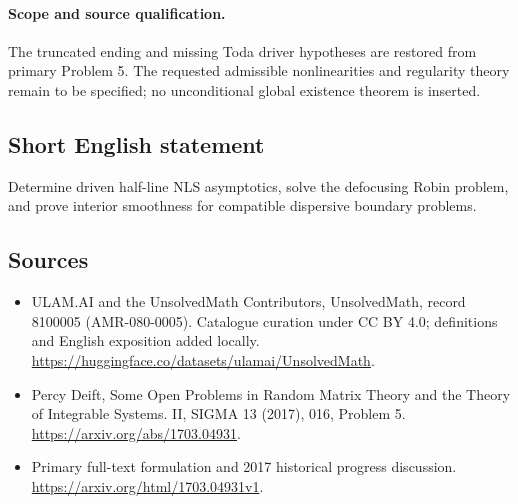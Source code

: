 \documentclass[11pt]{article}
\begin{document}
\paragraph{Scope and source qualification.}The truncated ending and missing Toda driver hypotheses are restored from primary Problem 5. The requested admissible nonlinearities and regularity theory remain to be specified; no unconditional global existence theorem is inserted.
\subsection{Short English statement}
Determine driven half-line NLS asymptotics, solve the defocusing Robin problem, and prove interior smoothness for compatible dispersive boundary problems.
\subsection{Sources}
\begin{itemize}
\item[\hypertarget{source:8100005:1}{S1}] ULAM.AI and the UnsolvedMath Contributors, UnsolvedMath, record 8100005 (AMR-080-0005). Catalogue curation under CC BY 4.0; definitions and English exposition added locally.
\url{https://huggingface.co/datasets/ulamai/UnsolvedMath}.
\item[\hypertarget{source:8100005:2}{S2}] Percy Deift, Some Open Problems in Random Matrix Theory and the Theory of Integrable Systems. II, SIGMA 13 (2017), 016, Problem 5.
\url{https://arxiv.org/abs/1703.04931}.
\item[\hypertarget{source:8100005:3}{S3}] Primary full-text formulation and 2017 historical progress discussion.
\url{https://arxiv.org/html/1703.04931v1}.
\end{itemize}
\label{end:8100005}
\end{document}
